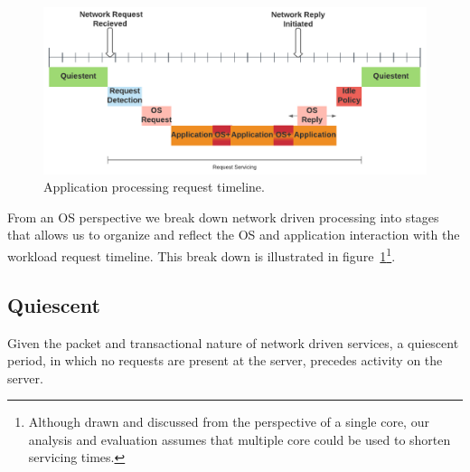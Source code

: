 
\begin{figure}
\centering
\includegraphics[width=1.1\columnwidth]{figures/timeline_chart}
\vspace*{-10mm}
\caption[]{Application processing request timeline.}
\label{fig:timeline}
\vspace{-0.20in}
\end{figure}

From an OS perspective we break down network driven processing into stages that allows us to organize and reflect the OS and application interaction with the workload request timeline. This break down is illustrated in figure~\ref{fig:timeline}\footnote{Although drawn and discussed from the perspective of a single core, our analysis and evaluation assumes that multiple core could be used to shorten servicing times.}.

\subsection{Quiescent}
\label{sec:workflow:Quiescent}
Given the packet and transactional nature of network driven services, a quiescent period, in which no requests are present at the server, precedes activity on the server. 

